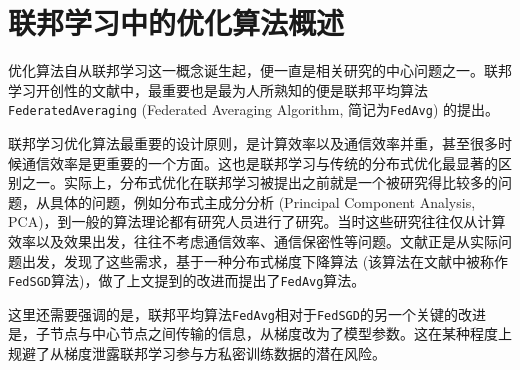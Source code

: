 \section{联邦学习中的优化算法概述}
\label{sec:chap2-overview}


优化算法自从联邦学习这一概念诞生起，便一直是相关研究的中心问题之一。联邦学习开创性的文献\parencite{mcmahan2017fed_avg}中，最重要也是最为人所熟知的便是联邦平均算法\texttt{FederatedAveraging} (Federated Averaging Algorithm, 简记为\texttt{FedAvg}) 的提出。

联邦学习优化算法最重要的设计原则，是计算效率以及通信效率并重，甚至很多时候通信效率是更重要的一个方面。这也是联邦学习与传统的分布式优化最显著的区别之一。实际上，分布式优化在联邦学习被提出之前就是一个被研究得比较多的问题，从具体的问题，例如分布式主成分分析 (Principal Component Analysis, PCA)\cite{dist_pca_2014_nips}，到一般的算法理论\cite{Mangasarian_1995_parallel,boyd2011distributed}都有研究人员进行了研究。当时这些研究往往仅从计算效率以及效果出发，往往不考虑通信效率、通信保密性等问题。文献\parencite{mcmahan2017fed_avg}正是从实际问题出发，发现了这些需求，基于一种分布式梯度下降算法\cite{chen2016_revisit} (该算法在文献\parencite{mcmahan2017fed_avg}中被称作\texttt{FedSGD}算法)，做了上文提到的改进而提出了\texttt{FedAvg}算法。

这里还需要强调的是，联邦平均算法\texttt{FedAvg}相对于\texttt{FedSGD}的另一个关键的改进是，子节点与中心节点之间传输的信息，从梯度改为了模型参数。这在某种程度上规避了从梯度泄露联邦学习参与方私密训练数据\cite{zhu2019deep_leakage}的潜在风险。

